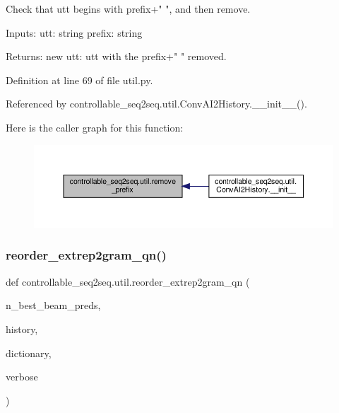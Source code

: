 \begin{DoxyVerb}Check that utt begins with prefix+" ", and then remove.

Inputs:
  utt: string
  prefix: string

Returns:
  new utt: utt with the prefix+" " removed.
\end{DoxyVerb}
 

Definition at line 69 of file util.\+py.



Referenced by controllable\+\_\+seq2seq.\+util.\+Conv\+A\+I2\+History.\+\_\+\+\_\+init\+\_\+\+\_\+().

Here is the caller graph for this function\+:
\nopagebreak
\begin{figure}[H]
\begin{center}
\leavevmode
\includegraphics[width=350pt]{namespacecontrollable__seq2seq_1_1util_a6667311d5a790733c7e4bee96705e5fe_icgraph}
\end{center}
\end{figure}
\mbox{\label{namespacecontrollable__seq2seq_1_1util_ab2f0e2b4043e6e1fbd59ca27b9383dc0}} 
\subsubsection{\texorpdfstring{reorder\+\_\+extrep2gram\+\_\+qn()}{reorder\_extrep2gram\_qn()}}
{\footnotesize\ttfamily def controllable\+\_\+seq2seq.\+util.\+reorder\+\_\+extrep2gram\+\_\+qn (\begin{DoxyParamCaption}\item[{}]{n\+\_\+best\+\_\+beam\+\_\+preds,  }\item[{}]{history,  }\item[{}]{dictionary,  }\item[{}]{verbose }\end{DoxyParamCaption})}

